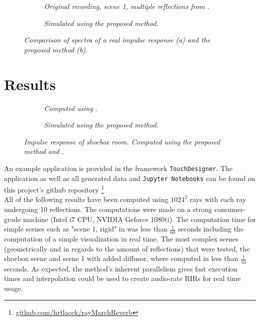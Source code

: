 \documentclass[twoside,a4paper]{article}
\begin{document}
\begin{figure}[ht]
    \center
    \begin{subfigure}[t]{0.45\textwidth}
      \centering
      
      \caption{\label{fig:fig:multReflSpecOrig} \it Original recording, scene 1, multiple reflections from \cite{brinkmann_round_2019}. }
    \end{subfigure}%
    \begin{subfigure}[t]{0.45\textwidth}
      \centering
      
      \caption{\label{fig:multReflSpecSim} \it Simulated using the proposed method. }
    \end{subfigure}
    \caption{\it Comparison of spectra of a real impulse response (a) and the proposed method (b).}
    \label{fig:multReflSpecCompare}
\end{figure}


\section{Results}

\begin{figure}[ht]
    \center
    \begin{subfigure}[t]{0.45\textwidth}
      \centering
      
    \caption{\label{fig:shoeA} \it Computed using \cite{lehmann_fast_2020}. }
    \end{subfigure}%
    \begin{subfigure}[t]{0.45\textwidth}
      \centering
      
      \caption{\label{fig:shoeB} \it Simulated using the proposed method. }
    \end{subfigure}
    \caption{\it Impulse response of shoebox room. Computed using the proposed method and \cite{lehmann_fast_2020}.}
    \label{fig:showSpecs}
\end{figure}

An example application is provided in the framework \texttt{TouchDesigner}. The application as well as all generated data and \texttt{Jupyter Notebooks} can be found on this project's github repository \footnote{ \href{https://github.com/hrtlacek/rayMarchReverb}{github.com/hrtlacek/rayMarchReverb}} \\
All of the following results have been computed using $1024^2$ rays with each ray undergoing 10 reflections. The computations were made on a strong consumer-grade machine (Intel i7 CPU, NVIDIA Geforce 1080ti). The computation time for simple scenes such as "scene 1, rigid" in \cite{brinkmann_round_2019} was less than $\frac{1}{60}$ seconds including the computation of a simple visualization in real time. The most complex scenes (geometrically and in regards to the amount of reflections) that were tested, the shoebox scene and scene 1 with added diffusor, where computed in less than $\frac{1}{50}$ seconds. As expected, the method's inherent parallelism gives fast execution times and interpolation could be used to create audio-rate RIRs for real time usage. \
\end{document}
